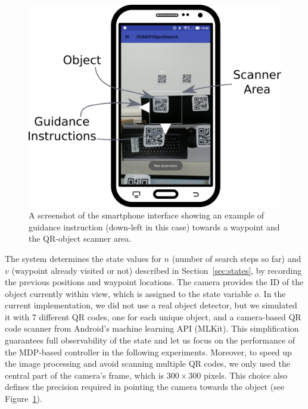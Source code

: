 \documentclass[a4paper, twoside]{article}
\begin{document}
\begin{figure}
  \centering
  \includegraphics[width=\columnwidth]{figures/system_screenshot2.png}
  \caption{A screenshot of the smartphone interface showing an example of guidance instruction (down-left in this case) towards a waypoint and the QR-object scanner area.}\label{fig:system-screenshot}
\end{figure}

The system determines the state values for $n$ (number of search steps so far) and $v$ (waypoint already visited or not) described in Section~\ref{sec:states}, by recording the previous positions and waypoint locations. The camera provides the ID of the object currently within view, which is assigned to the state variable $o$. In the current implementation, we did not use a real object detector, but we simulated it with 7 different QR codes, one for each unique object, and a camera-based QR code scanner from Android's machine learning API (MLKit). This simplification guarantees full observability of the state and let us focus on the performance of the MDP-based controller in the following experiments. 
%
Moreover, to speed up the image processing and avoid scanning multiple QR codes, we only used the central part of the camera's frame, which is $300\times300$ pixels. This choice also defines the precision required in pointing the camera towards the object (see Figure~\ref{fig:system-screenshot}).
\end{document}
